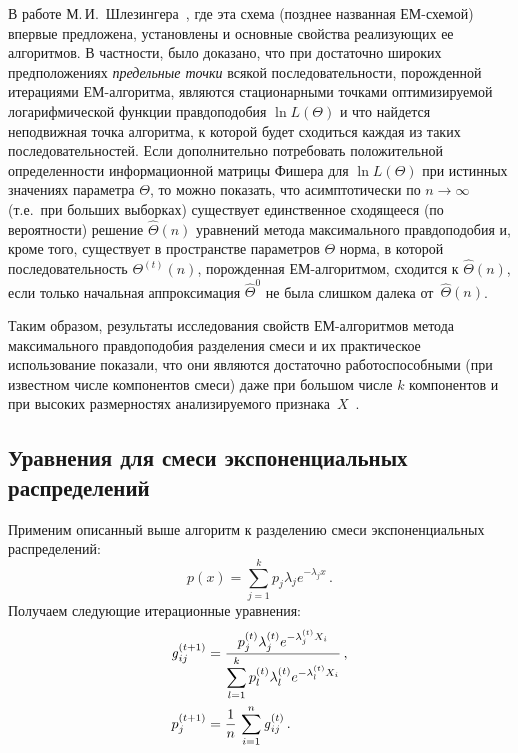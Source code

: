 \begin{multicols}{2}
В работе М.\,И.~Шлезингера~\cite{5bat}, где эта схема (позднее названная
ЕМ-схемой) впервые предложена, установлены и основные свойства
реа\-ли\-зу\-ющих ее алгоритмов. В частности, было доказано, что при достаточно
широких предположениях \textit{предельные точки} всякой последовательности,
порожденной итерациями ЕМ-алгоритма, являются стационарными точками
оптимизируемой логарифмической функции правдоподобия $\ln L(\Theta )$ и что
найдется неподвижная точка алгоритма, к которой будет сходиться каждая из таких
последовательностей. Если дополнительно потребовать положительной
определенности информационной мат\-ри\-цы Фишера для $\ln L(\Theta )$ при
истинных зна\-че\-ни\-ях па\-ра\-мет\-ра $\Theta$, то можно показать, что
асимптотически по $n\rightarrow\infty$ (т.е.\ при больших выборках) существует
единственное сходящееся (по веро\-ят\-но\-сти) решение $\hat{\Theta}(n)$
уравнений метода максимального правдоподобия и, кроме того, существует в
пространстве параметров $\Theta$ норма, в которой последовательность
$\Theta^{(t)}(n)$, порожденная ЕМ-ал\-го\-рит\-мом, сходится к $\hat{\Theta}
(n)$, если только начальная аппроксимация $\hat{\Theta}^0$ не была слишком
далека от~$\hat{\Theta} (n)$. {%

}

Таким образом, результаты исследования свойств ЕМ-алгоритмов метода
максимального правдоподобия разделения смеси и их практическое
использование показали, что они являются достаточно работоспособными (при
известном чис\-ле компонентов смеси) даже при большом чис\-ле $k$ компонентов и
при высоких размерностях анализируемого признака~$X$~\cite{3bat}.

\subsection{Уравнения для смеси экспоненциальных распределений}

Применим описанный выше алгоритм к разделению смеси
экспоненциальных распределений:
$$
p(x) = \sum\limits_{j=1}^k p_j \lambda_j e^{-\lambda_j x}\,.
$$
Получаем следующие итерационные уравнения:
\begin{align*}
\mbox{\textit{g}}_{ij}^{(t+1)} & = \displaystyle\frac{\displaystyle p_j^{(t)}\lambda_j^{(t)}e^{-
\lambda_j^{(t)}X_i}\mathstrut}{\displaystyle \sum\limits_{l=1}^k p_l^{(t)}\lambda_l^{(t)}
e^{-\lambda_l^{(t)}X_i}\mathstrut}\,,\\
p_j^{(t+1)} & = \displaystyle\frac{\displaystyle 1\mathstrut}{\displaystyle n\mathstrut}\,\sum\limits_{i=1}^n \mbox{\textit{g}}_{ij}^{(t)}\,.
\end{align*}


\end{multicols}
